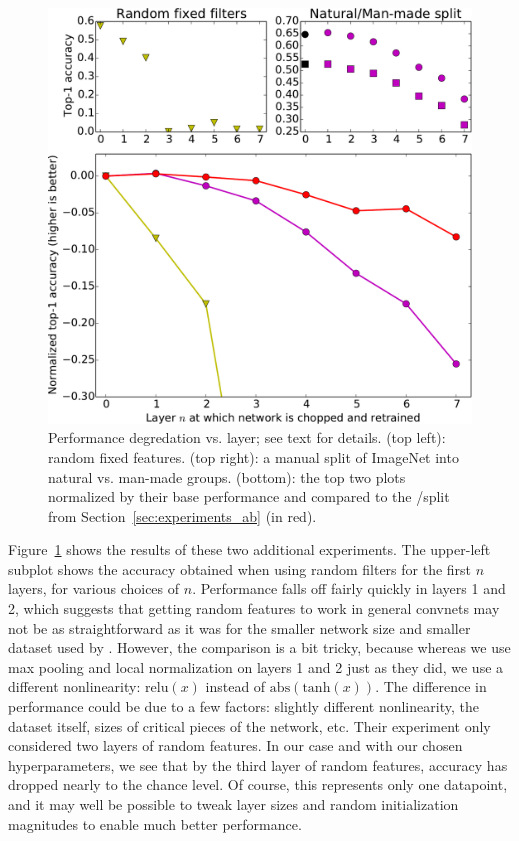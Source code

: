 \begin{figure}[t]
\begin{center}
\includegraphics[width=.65\linewidth]{plots/result_random_nm_combined_crop.pdf}
\end{center}
\caption{Performance degredation vs. layer; see text for details. (top left): random fixed features. (top right): a manual split of ImageNet into natural vs. man-made groups. (bottom): the top two plots normalized by their base performance and compared to the \dA/\dB split from Section~\ref{sec:experiments_ab} (in red).}
\label{fig:random_and_nm}
\end{figure}

Figure~\ref{fig:random_and_nm} shows the results of these two additional experiments. The upper-left subplot shows the accuracy obtained when using random filters for the first $n$ layers, for various choices of $n$. Performance falls off fairly quickly in layers 1 and 2, which suggests that getting random features to work in general convnets may not be as straightforward as it was for the smaller network size and smaller dataset used by \cite{Jarrett-ICCV2009}. However, the comparison is a bit tricky, because whereas we use max pooling and local normalization on layers 1 and 2 just as they did, we use a different nonlinearity: $\mathrm{relu}(x)$ instead of $\mathrm{abs}(\mathrm{tanh}(x))$. The difference in performance could be due to a few factors: slightly different nonlinearity, the dataset itself, sizes of critical pieces of the network, etc. Their experiment only considered two layers of random features. In our case and with our chosen hyperparameters, we see that by the third layer of random features, accuracy has dropped nearly to the chance level. Of course, this represents only one datapoint, and it may well be possible to tweak layer sizes and random initialization magnitudes to enable much better performance.

